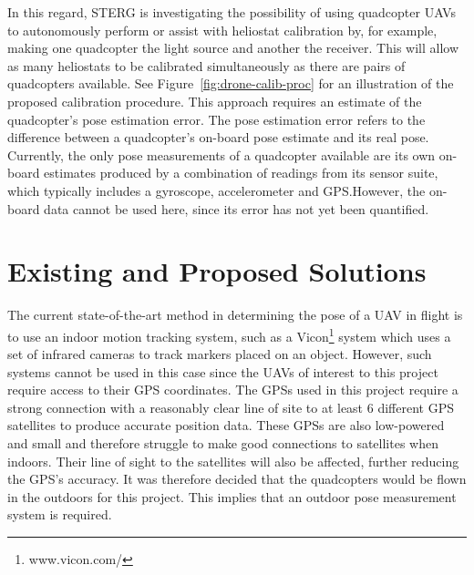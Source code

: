In this regard, STERG is investigating the possibility of using quadcopter UAVs to autonomously perform or assist with heliostat calibration by, for example, making one quadcopter the light source and another the receiver. This will allow as many heliostats to be calibrated simultaneously as there are pairs of quadcopters available. See Figure~\ref{fig:drone-calib-proc} for an illustration of the proposed calibration procedure. This approach requires an estimate of the quadcopter's pose estimation error. The pose estimation error refers to the difference between a quadcopter's on-board pose estimate and its real pose. Currently, the only pose measurements of a quadcopter available are its own on-board estimates produced by a combination of readings from its sensor suite, which typically includes a gyroscope, accelerometer and GPS.\@ However, the on-board data cannot be used here, since its error has not yet been quantified.




\section{Existing and Proposed Solutions}

The current state-of-the-art method in determining the pose of a UAV in flight is to use an indoor motion tracking system, such as a Vicon\footnote{www.vicon.com/} system which uses a set of infrared cameras to track markers placed on an object. However, such systems cannot be used in this case since the UAVs of interest to this project require access to their GPS coordinates. The GPSs used in this project require a strong connection with a reasonably clear line of site to at least 6 different GPS satellites to produce accurate position data. These GPSs are also low-powered and small and therefore struggle to make good connections to satellites when indoors. Their line of sight to the satellites will also be affected, further reducing the GPS's accuracy. It was therefore decided that the quadcopters would be flown in the outdoors for this project. This implies that an outdoor pose measurement system is required. 

